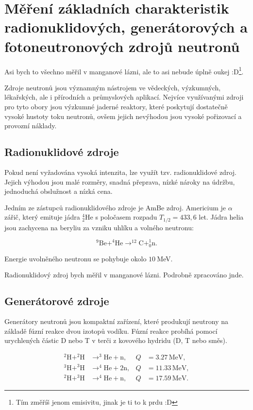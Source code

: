 \section[Neutronové zdroje]{Měření základních charakteristik radionuklidových, generátorových a fotoneutronových zdrojů neutronů}
Asi bych to všechno měřil v manganové lázni, ale to asi nebude úplně oukej :D\footnote{Tím změříš jenom emisivitu, jinak je ti to k prdu :D}.

Zdroje neutronů jsou významným nástrojem  ve vědeckých, výzkumných, lékařských, ale i přírodních a průmyslových aplikací. Nejvíce využívanými zdroji pro tyto obory jsou výzkumné jaderné reaktory, které poskytují dostatečně vysoké hustoty toku neutronů, ovšem jejich nevýhodou jsou vysoké pořizovací a provozní náklady.

\subsection{Radionuklidové zdroje}

Pokud není vyžadována vysoká intenzita, lze využít tzv. radionuklidové zdroj. Jejich výhodou jsou malé rozměry, snadná přeprava, nízké nároky na údržbu, jednoduchá obslužnost a nízká cena.

Jedním ze zástupců radionuklidového zdroje je AmBe zdroj. Americium je $\alpha$ zářič, který emituje jádra $^4_2$He s poločasem rozpadu $T_{1/2}= 433,6$ let. Jádra helia jsou zachycena na beryliu za vzniku uhlíku a volného neutronu:

\begin{equation*}
    ^{9}\text{Be} + ^{4}\text{He} \longrightarrow  ^{12}\text{C} + ^1_0\text{n}.
\end{equation*}

Energie uvolněného neutronu se pohybuje okolo $10\ $MeV.

Radionuklidový zdroj bych měřil v manganové lázni. Podrobně zpracováno jnde.

\subsection{Generátorové zdroje}

Generátory neutronů jsou kompaktní zařízení, které produkují neutrony na základě fúzní reakce dvou izotopů vodíku. Fúzní reakce probíhá pomocí urychlených částic D nebo T v terči z kovového hydridu (D, T nebo směs). 

\begin{align*}
^2\text{H} + ^2\text{H} &\to ^3\text{He} + \text{n}, & Q &= 3.27 \, \text{MeV}, \\
^3\text{H} + ^3\text{H} &\to ^4\text{He} + 2\text{n}, & Q &= 11.33 \, \text{MeV}, \\
^2\text{H} + ^3\text{H} &\to ^4\text{He} + \text{n}, & Q &= 17.59 \, \text{MeV}.
\end{align*}

